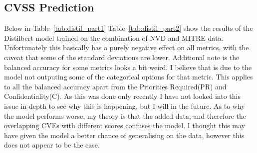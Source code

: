 \documentclass[12pt]{article}
\begin{document}
\subsection{CVSS Prediction}

Below in Table~\ref{tab:distil_part1} Table~\ref{tab:distil_part2} show the results of the
Distilbert model trained on the combination of NVD and MITRE data. Unfortunately this basically has
a purely negative effect on all metrics, with the caveat that some of the standard deviations are
lower. Additional note is the balanced accuracy for some metrics looks a bit weird, I believe that
is due to the model not outputing some of the categorical options for that metric. This applies to
all the balanced accuracy apart from the Priorities Required(PR) and Confidentiality(C). As this was
done only recently I have not looked into this issue in-depth to see why this is happening, but I
will in the future. As to why the model performs worse, my theory is that the added data, and
therefore the overlapping CVEs with different scores confuses the model. I thought this may have
given the model a better chance of generalising on the data, however this does not appear to be the
case.

\begin{table}[H]
	\centering
	\label{tab:distil_part1}
	\caption{Comparison of the effects of the X pre-trained models on the CVSS v3.1 dataset (Part 1).}
\end{table}
\end{document}
